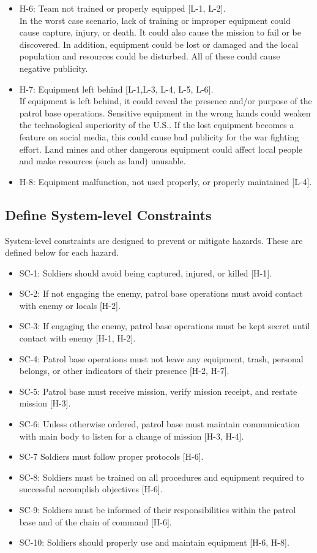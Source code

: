 \documentclass[../../main/main.tex]{subfiles}
\begin{document}
\begin{itemize}
\item H-6: Team not trained or properly equipped [L-1, L-2].\\
In the worst case scenario, lack of training or improper equipment could cause capture, injury, or death.  It could also cause the mission to fail or be discovered.  In addition, equipment could be lost or damaged and the local population and resources could be disturbed.  All of these could cause negative publicity.

\item H-7: Equipment left behind [L-1,L-3, L-4, L-5, L-6].\\
If equipment is left behind, it could reveal the presence and/or purpose of the patrol base operations.  Sensitive equipment in the wrong hands could weaken the technological superiority of the U.S.. If the lost equipment becomes a feature on social media, this could cause bad publicity for the war fighting effort.  Land mines and other dangerous equipment could affect local people and make resources (such as land) unusable.

\item H-8: Equipment malfunction, not used properly, or properly maintained [L-4].\\
\end{itemize}

\subsection{Define System-level Constraints}
System-level constraints are designed to prevent or mitigate hazards.  These are defined below for each hazard.

\begin{itemize}
\item SC-1: Soldiers should avoid being captured, injured, or killed [H-1].
\item SC-2: If not engaging the enemy, patrol base operations must avoid contact with enemy or locals [H-2].
\item SC-3: If engaging the enemy, patrol base operations must be kept secret until contact with enemy [H-1, H-2].
\item SC-4: Patrol base operations must not leave any equipment, trash, personal belongs, or other indicators of their presence [H-2, H-7].
\item SC-5: Patrol base must receive mission, verify mission receipt, and restate mission [H-3].
\item SC-6: Unless otherwise ordered, patrol base must maintain communication with main body to listen for a change of mission [H-3, H-4].
\item SC-7 Soldiers must follow proper protocols [H-6].
\item SC-8: Soldiers must be trained on all procedures and equipment required to successful accomplish objectives [H-6].
\item SC-9: Soldiers must be informed of their responsibilities within the patrol base and of the chain of command [H-6].
\item SC-10: Soldiers should properly use and maintain equipment [H-6, H-8].
\end{itemize}
\end{document}
